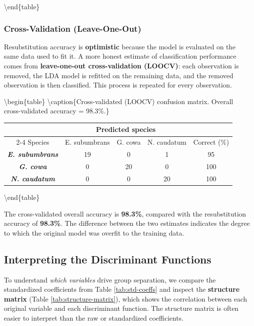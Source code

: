 \documentclass[
]{book}
\begin{document}
\textbackslash end\{table\}

\subsubsection{Cross-Validation (Leave-One-Out)}\label{cross-validation-leave-one-out}

Resubstitution accuracy is \textbf{optimistic} because the model is evaluated on the same data used to fit it. A more honest estimate of classification performance comes from \textbf{leave-one-out cross-validation (LOOCV)}: each observation is removed, the LDA model is refitted on the remaining data, and the removed observation is then classified. This process is repeated for every observation.

\textbackslash begin\{table\}
\centering
\textbackslash caption\{\label{tab:loocv-matrix}Cross-validated (LOOCV) confusion matrix. Overall cross-validated accuracy = 98.3\%.\}
\centering

\begin{tabular}[t]{>{}c|c|c|c|c}
\hline
\multicolumn{1}{c|}{ } & \multicolumn{3}{c|}{Predicted species} & \multicolumn{1}{c}{ } \\
\cline{2-4}
Species & E. subumbrans & G. cowa & N. caudatum & Correct (\%)\\
\hline
\em{\textbf{E. subumbrans}} & 19 & 0 & 1 & 95\\
\hline
\em{\textbf{G. cowa}} & 0 & 20 & 0 & 100\\
\hline
\em{\textbf{N. caudatum}} & 0 & 0 & 20 & 100\\
\hline
\end{tabular}

\textbackslash end\{table\}

The cross-validated overall accuracy is \textbf{98.3\%}, compared with the resubstitution accuracy of \textbf{98.3\%}. The difference between the two estimates indicates the degree to which the original model was overfit to the training data.

\subsection{Interpreting the Discriminant Functions}\label{interpreting-the-discriminant-functions}

To understand \emph{which variables} drive group separation, we compare the standardized coefficients from Table \ref{tab:std-coeffs} and inspect the \textbf{structure matrix} (Table \ref{tab:structure-matrix}), which shows the correlation between each original variable and each discriminant function. The structure matrix is often easier to interpret than the raw or standardized coefficients.
\end{document}
